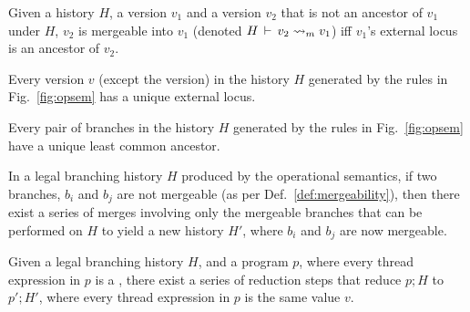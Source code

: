 \begin{definition} 
\label{def:mergeability}
Given a history $H$, a version $v_1$ and a version $v_2$ that is not
an ancestor of $v_1$ under $H$, $v_2$ is mergeable into $v_1$ (denoted
$H\,\vdash\,v_2 \rightsquigarrow_m v_1$) iff $v_1$'s external locus is an
ancestor of $v_2$.
\end{definition}

\begin{lemma} 
Every version $v$ (except the  version) in the history $H$
generated by the rules in Fig.~\ref{fig:opsem} has a unique external
locus.
\end{lemma}

\begin{lemma} 
Every pair of branches in the history $H$ generated by the rules in
Fig.~\ref{fig:opsem} have a unique least common ancestor. 
\end{lemma}

\begin{lemma} 
In a legal branching history $H$ produced by the operational
semantics, if two branches, $b_i$ and $b_j$ are not mergeable (as per
Def.~\ref{def:mergeability}), then there exist a series of merges
involving only the mergeable branches that can be performed on $H$ to
yield a new history $H'$, where $b_i$ and $b_j$ are now mergeable.
\end{lemma}

\begin{theorem}  Given a
legal branching history $H$, and a program $p$, where every thread
expression in $p$ is a , there exist a series of reduction steps
that reduce $p; H$ to $p'; H'$, where every thread expression in $p$
is the same value $v$.
\end{theorem}


